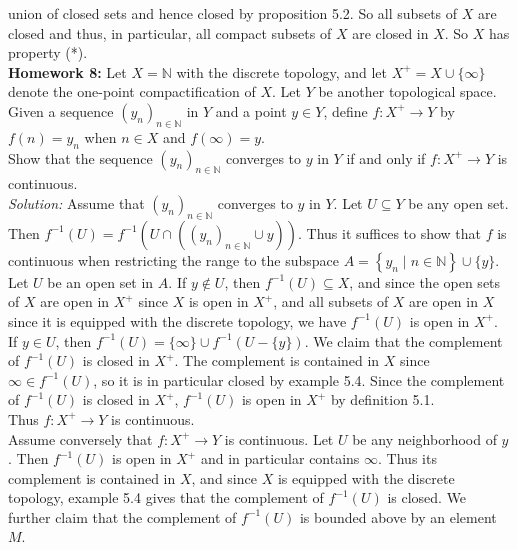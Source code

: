 \documentclass[a4paper]{article}
\begin{document}
union of closed sets and hence closed by proposition 5.2. So all subsets of $X$
are closed and thus, in particular, all compact subsets of $X$ are closed in
$X$. So $X$ has property (*).\\
\linebreak
\textbf{Homework 8:} Let $X = \mathbb{N}$ with the discrete topology, and let
$X^{+} = X \cup \{\infty \}$ denote the one-point compactification of $X$. Let
$Y$ be another topological space. Given a sequence $\left( y_n \right)_{n \in
\mathbb{N}}$ in $Y$ and a point $y \in Y$, define $f \colon X^{+} \to Y$ by
$f(n) = y_n$ when $n \in X$ and $f(\infty) = y$.\\
Show that the sequence $(y_n)_{n \in \mathbb{N}}$ converges to $y$ in $Y$ if
and only if $f \colon X^{+} \to Y$ is continuous.\\
\linebreak
\textit{Solution:} Assume that $(y_n)_{n \in \mathbb{N}}$ converges to $y$ in
$Y$. Let $U \subseteq Y$ be any open set. Then $f^{-1}(U) = f^{-1}\left( U
\cap \left( (y_n)_{n \in \mathbb{N}}\cup y \right) \right) $. Thus it suffices
to show that $f$ is continuous when restricting the range to the subspace
$A = \left\{ y_n  \mid n \in \mathbb{N} \right\} \cup \{y\}$. 
Let $U$ be an open set in $A$. If $y \not\in U$, then $f^{-1}(U) \subseteq X$,
and since the open sets of $X$ are open in $X^{+}$ since $X$ is open in $X^{+}$, and all subsets of $X$ are
open in $X$ since it is equipped with the discrete topology, we have
$f^{-1}(U)$ is open in $X^{+}$.\\
If $y \in U$, then $f^{-1} (U) = \{\infty\} \cup f^{-1}\left( U - \{y\} \right)
$. We claim that the complement of $f^{-1}(U)$ is closed in $X^{+}$.
The complement is contained in $X$ since $\infty \in f^{-1}(U)$, so it is in
particular closed by example 5.4. Since the complement of $f^{-1}(U)$ is closed
in $X^{+}$, $f^{-1}(U)$ is open in $X^{+}$ by definition 5.1.\\
Thus $f \colon X^{+} \to Y$ is continuous.\\
\linebreak
Assume conversely that $f \colon X^{+} \to Y$ is continuous. Let $U$ be any
neighborhood of $y$. Then $f^{-1}(U)$ is open in $X^{+}$ and in particular
contains $\infty$. Thus its complement is contained in $X$, and since $X$ is
equipped with the discrete topology, example 5.4 gives that the complement of
$f^{-1}(U)$ is closed. We further claim that the complement of $f^{-1}(U)$ is
bounded above by an element $M$.\\
\end{document}
